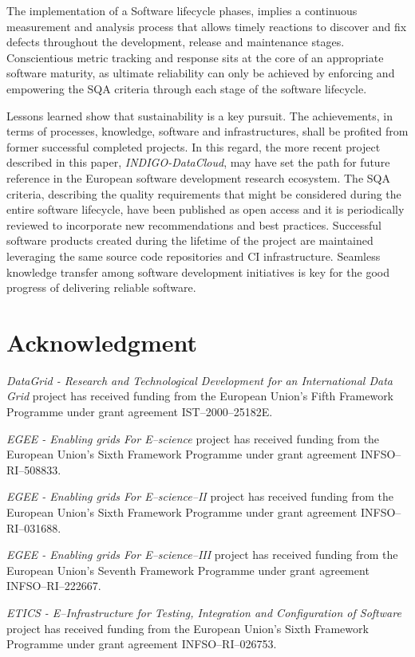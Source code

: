 \documentclass[journal]{IEEEtran}
\begin{document}
The implementation of a Software lifecycle phases, implies a continuous measurement and analysis
process that allows timely reactions to discover and fix defects throughout the
development, release and maintenance stages. Conscientious metric
tracking and response sits at the core of an appropriate software maturity, as
ultimate reliability can only be achieved by enforcing and empowering the SQA
criteria through each stage of the software lifecycle.

Lessons learned show that sustainability is a key pursuit. The achievements, in terms of
processes, knowledge, software and infrastructures, shall be profited from former successful 
completed projects. In this regard, the more recent project described in this paper, {\sl INDIGO-DataCloud},
may have set the path for future reference in the European software development research ecosystem.
The SQA criteria, describing the quality requirements that might be considered during the entire
software lifecycle, have been published as open access and it is periodically reviewed to incorporate
new recommendations and best practices. Successful software products created during the lifetime of the 
project are maintained leveraging the same source code repositories and CI infrastructure. Seamless 
knowledge transfer among software development initiatives is key for the good progress of delivering
reliable software.


\section*{Acknowledgment}

{\sl DataGrid - Research and Technological Development for an International Data Grid}
project has received funding from the European Union's Fifth Framework Programme under
grant agreement IST--2000--25182E.

{\sl EGEE - Enabling grids For E--science} project has received funding from the European
Union's Sixth Framework Programme under grant agreement INFSO--RI--508833.

{\sl EGEE - Enabling grids For E--science--II} project has received funding from the
European Union's Sixth Framework Programme under grant agreement INFSO--RI--031688.

{\sl EGEE - Enabling grids For E--science--III} project has received funding from the
European Union's Seventh Framework Programme under grant agreement INFSO--RI--222667.

{\sl ETICS - E--Infrastructure for Testing, Integration and Configuration of Software}
project has received funding from the European Union's Sixth Framework Programme under
grant agreement INFSO--RI--026753.
\end{document}
